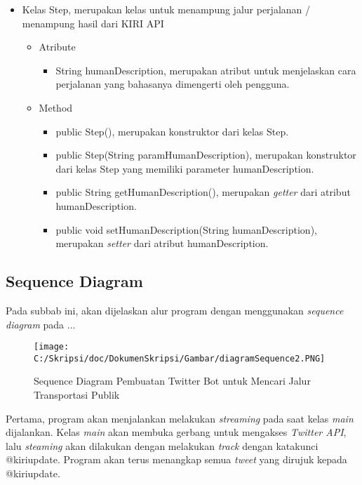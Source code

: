 \begin{itemize}
		\item Kelas Step, merupakan kelas untuk menampung jalur perjalanan / menampung hasil dari KIRI API
		
		
				\begin{itemize}
							\item Atribute
					
					
									\begin{itemize}
												\item String humanDescription, merupakan atribut untuk menjelaskan cara perjalanan yang bahasanya dimengerti oleh pengguna.
									\end{itemize}
					
							\item Method
					
					
									\begin{itemize}
												\item public Step(), merupakan konstruktor dari kelas Step.
												\item public Step(String paramHumanDescription), merupakan konstruktor dari kelas Step yang memiliki parameter humanDescription.
												\item public String getHumanDescription(), merupakan \textit{getter} dari atribut humanDescription.
												\item public void setHumanDescription(String humanDescription), merupakan \textit{setter} dari atribut humanDescription.
									\end{itemize}
				\end{itemize}
\end{itemize}




\subsection{Sequence Diagram}

Pada subbab ini, akan dijelaskan alur program dengan menggunakan \textit{sequence diagram} pada ...

\begin{figure}[htbp]
	\centering
		\texttt{[image: C:/Skripsi/doc/DokumenSkripsi/Gambar/diagramSequence2.PNG]}
	\caption{Sequence Diagram Pembuatan Twitter Bot untuk Mencari Jalur Transportasi Publik}
	\label{fig:diagramSequence2}
\end{figure}


Pertama, program akan menjalankan melakukan \textit{streaming} pada saat kelas \textit{main} dijalankan. Kelas \textit{main} akan membuka gerbang untuk mengakses \textit{Twitter API}, lalu \textit{steaming} akan dilakukan dengan melakukan \textit{track} dengan katakunci @kiriupdate. Program akan terus menangkap semua \textit{tweet} yang dirujuk kepada @kiriupdate.

